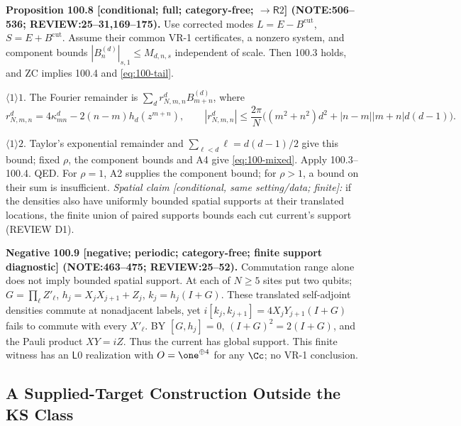 \textbf{Proposition 100.8 [conditional; full; category-free; \(\to\mathsf R2\)] (NOTE:506--536; REVIEW:25--31,169--175).}
Use corrected modes \(L=E-B^{\mathrm{cut}}\), \(S=E+B^{\mathrm{cut}}\). Assume their common VR-1 certificates,
a nonzero system, and component bounds \(|B_n^{(d)}|_{s,1}\le M_{d,n,s}\) independent of scale.
Then 100.3 holds, and ZC implies 100.4 and \eqref{eq:100-tail}.
\par\(\langle1\rangle1\). The Fourier remainder is \(\sum_dr^d_{N,m,n}B_{m+n}^{(d)}\), where
\[
 r^d_{N,m,n}=4\kappa^d_{mn}-2(n-m)h_d(z^{m+n}),\qquad
 |r^d_{N,m,n}|\le\frac{2\pi}{N}\big((m^2+n^2)d^2+|n-m||m+n|d(d-1)\big).
\]
\par\(\langle1\rangle2\). Taylor's exponential remainder and \(\sum_{\ell<d}\ell=d(d-1)/2\) give this bound;
fixed \(\rho\), the component bounds and A4 give \eqref{eq:100-mixed}. Apply 100.3--100.4. QED.
For \(\rho=1\), A2 supplies the component bound; for \(\rho>1\), a bound on their sum is insufficient.
\emph{Spatial claim [conditional, same setting/data; finite]:} if the densities also have uniformly bounded spatial
supports at their translated locations, the finite union of paired supports bounds each cut current's support (REVIEW D1).

\textbf{Negative 100.9 [negative; periodic; category-free; finite support diagnostic] (NOTE:463--475; REVIEW:25--52).}
Commutation range alone does not imply bounded spatial support. At each of \(N\ge5\) sites put two qubits;
\(G=\prod_\ell Z'_\ell\), \(h_j=X_jX_{j+1}+Z_j\), \(k_j=h_j(I+G)\). These translated self-adjoint densities
commute at nonadjacent labels, yet \(i[k_j,k_{j+1}]=4X_jY_{j+1}(I+G)\) fails to commute with every \(X'_\ell\).
BY \([G,h_j]=0\), \((I+G)^2=2(I+G)\), and the Pauli product \(XY=iZ\). Thus the current has global support.
This finite witness has an \(\mathsf L0\) realization with \(O=\one^{\oplus4}\) for any \(\Cc\); no VR-1 conclusion.

\subsection{A Supplied-Target Construction Outside the KS Class}

